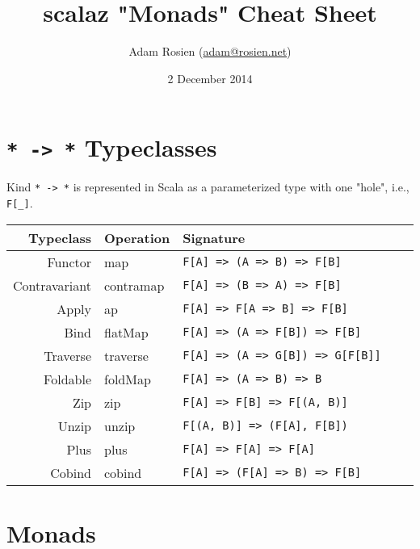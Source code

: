 \documentclass{tufte-handout}
\title{scalaz "Monads" Cheat Sheet}
\author[Adam Rosien]{Adam Rosien (\href{mailto:adam@rosien.net}{adam@rosien.net})}
\date{2 December 2014}  %
\begin{document}
\maketitle%


\section{\texttt{* -> *} Typeclasses}\label{sec:sigs}

Kind \texttt{* -> *} is represented in Scala as a parameterized type with one "hole", i.e., \texttt{F[\_]}.

\begin{table}[ht]
  \centering
  \selectfont
  \begin{tabular}{rllll}
    \toprule
    Typeclass & Operation & Signature \\ 
    \midrule
    Functor & map & \texttt{F[A] => (A => B) => F[B]} \\
    Contravariant & contramap & \texttt{F[A] => (B => A) => F[B]} \\
    Apply & ap & \texttt{F[A] => F[A => B] => F[B]} \\
    Bind & flatMap & \texttt{F[A] => (A => F[B]) => F[B]} \\
    Traverse & traverse & \texttt{F[A] => (A => G[B]) => G[F[B]]} \\
    Foldable & foldMap & \texttt{F[A] => (A => B) => B} \\
    Zip & zip & \texttt{F[A] => F[B] => F[(A, B)]} \\
    Unzip & unzip & \texttt{F[(A, B)] => (F[A], F[B])} \\
    Plus & plus & \texttt{F[A] => F[A] => F[A]} \\
    \midrule
    Cobind & cobind & \texttt{F[A] => (F[A] => B) => F[B]} \\
   \bottomrule
  \end{tabular}
  \label{tab:normaltab}
\end{table}


\section{Monads}\label{sec:monads}
\end{document}
